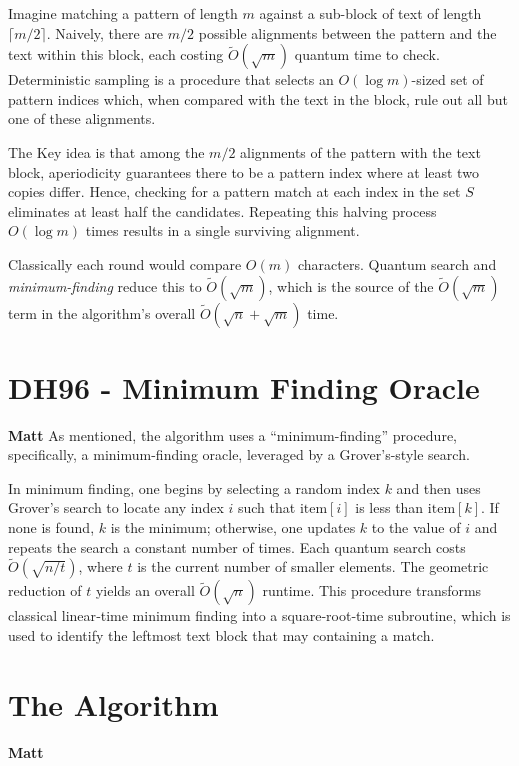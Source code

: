 \documentclass[11pt]{article}
\begin{document}
Imagine matching a pattern of length \(m\) against a sub-block of text of length \(\lceil m/2\rceil\). Naively, there are \(m/2\) possible alignments between the pattern and the text within this block, each costing \(\widetilde{O}(\sqrt{m})\) quantum time to check. Deterministic sampling is a procedure that selects an \(O(\log m)\)-sized set of pattern indices which, when compared with the text in the block, rule out all but one of these alignments.

The Key idea is that among the \(m/2\) alignments of the pattern with the text block, aperiodicity guarantees there to be a pattern index where at least two copies differ. Hence, checking for a pattern match at each index in the set \(S\) eliminates at least half the candidates. Repeating this halving process \(O(\log m)\) times results in a single surviving alignment.

Classically each round would compare \(O(m)\) characters. Quantum search and \textit{minimum-finding} reduce this to \(\widetilde O(\sqrt{m})\), which is the source of the \(\widetilde O(\sqrt{m})\) term in the algorithm's overall \(\widetilde O(\sqrt{n} + \sqrt{m})\) time.


\section*{DH96 - Minimum Finding Oracle}
\textbf{Matt}\linebreak
As mentioned, the algorithm uses a ``minimum-finding'' procedure, specifically, a minimum-finding oracle, leveraged by a Grover's-style search.

In minimum finding, one begins by selecting a random index \(k\) and then uses Grover’s search to locate any index \(i\) such that \(\text{item}[i]\) is less than \(\text{item}[k]\). If none is found, \(k\) is the minimum; otherwise, one updates \(k\) to the value of \(i\) and repeats the search a constant number of times. Each quantum search costs \(\widetilde{O}(\sqrt{n/t})\), where \(t\) is the current number of smaller elements. The geometric reduction of \(t\) yields an overall \(\widetilde{O}(\sqrt{n})\) runtime. This procedure transforms classical linear‐time minimum finding into a square‐root‐time subroutine, which is used to identify the leftmost text block that may containing a match.

\section*{The Algorithm}
\textbf{Matt} \linebreak
\end{document}
